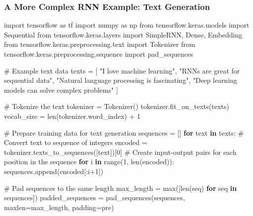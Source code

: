 \documentclass[
  letterpaper,
  DIV=11,
  numbers=noendperiod]{scrreprt}
\newenvironment{Shaded}{\begin{snugshade}}{\end{snugshade}}
\newcommand{\BuiltInTok}[1]{\textcolor[rgb]{0.00,0.23,0.31}{#1}}
\newcommand{\CommentTok}[1]{\textcolor[rgb]{0.37,0.37,0.37}{#1}}
\newcommand{\ControlFlowTok}[1]{\textcolor[rgb]{0.00,0.23,0.31}{\textbf{#1}}}
\newcommand{\DecValTok}[1]{\textcolor[rgb]{0.68,0.00,0.00}{#1}}
\newcommand{\ImportTok}[1]{\textcolor[rgb]{0.00,0.46,0.62}{#1}}
\newcommand{\KeywordTok}[1]{\textcolor[rgb]{0.00,0.23,0.31}{\textbf{#1}}}
\newcommand{\NormalTok}[1]{\textcolor[rgb]{0.00,0.23,0.31}{#1}}
\newcommand{\OperatorTok}[1]{\textcolor[rgb]{0.37,0.37,0.37}{#1}}
\newcommand{\StringTok}[1]{\textcolor[rgb]{0.13,0.47,0.30}{#1}}
\begin{document}
\subsubsection{A More Complex RNN Example: Text
Generation}\label{a-more-complex-rnn-example-text-generation}

\begin{Shaded}
\begin{Highlighting}[]
\ImportTok{import}\NormalTok{ tensorflow }\ImportTok{as}\NormalTok{ tf}
\ImportTok{import}\NormalTok{ numpy }\ImportTok{as}\NormalTok{ np}
\ImportTok{from}\NormalTok{ tensorflow.keras.models }\ImportTok{import}\NormalTok{ Sequential}
\ImportTok{from}\NormalTok{ tensorflow.keras.layers }\ImportTok{import}\NormalTok{ SimpleRNN, Dense, Embedding}
\ImportTok{from}\NormalTok{ tensorflow.keras.preprocessing.text }\ImportTok{import}\NormalTok{ Tokenizer}
\ImportTok{from}\NormalTok{ tensorflow.keras.preprocessing.sequence }\ImportTok{import}\NormalTok{ pad\_sequences}

\CommentTok{\# Example text data}
\NormalTok{texts }\OperatorTok{=}\NormalTok{ [}
    \StringTok{"I love machine learning"}\NormalTok{,}
    \StringTok{"RNNs are great for sequential data"}\NormalTok{,}
    \StringTok{"Natural language processing is fascinating"}\NormalTok{,}
    \StringTok{"Deep learning models can solve complex problems"}
\NormalTok{]}

\CommentTok{\# Tokenize the text}
\NormalTok{tokenizer }\OperatorTok{=}\NormalTok{ Tokenizer()}
\NormalTok{tokenizer.fit\_on\_texts(texts)}
\NormalTok{vocab\_size }\OperatorTok{=} \BuiltInTok{len}\NormalTok{(tokenizer.word\_index) }\OperatorTok{+} \DecValTok{1}

\CommentTok{\# Prepare training data for text generation}
\NormalTok{sequences }\OperatorTok{=}\NormalTok{ []}
\ControlFlowTok{for}\NormalTok{ text }\KeywordTok{in}\NormalTok{ texts:}
    \CommentTok{\# Convert text to sequence of integers}
\NormalTok{    encoded }\OperatorTok{=}\NormalTok{ tokenizer.texts\_to\_sequences([text])[}\DecValTok{0}\NormalTok{]}
    \CommentTok{\# Create input{-}output pairs for each position in the sequence}
    \ControlFlowTok{for}\NormalTok{ i }\KeywordTok{in} \BuiltInTok{range}\NormalTok{(}\DecValTok{1}\NormalTok{, }\BuiltInTok{len}\NormalTok{(encoded)):}
\NormalTok{        sequences.append(encoded[:i}\OperatorTok{+}\DecValTok{1}\NormalTok{])}

\CommentTok{\# Pad sequences to the same length}
\NormalTok{max\_length }\OperatorTok{=} \BuiltInTok{max}\NormalTok{([}\BuiltInTok{len}\NormalTok{(seq) }\ControlFlowTok{for}\NormalTok{ seq }\KeywordTok{in}\NormalTok{ sequences])}
\NormalTok{padded\_sequences }\OperatorTok{=}\NormalTok{ pad\_sequences(sequences, maxlen}\OperatorTok{=}\NormalTok{max\_length, padding}\OperatorTok{=}\StringTok{\textquotesingle{}pre\textquotesingle{}}\NormalTok{)}


\end{Highlighting}
\end{Shaded}
\end{document}
